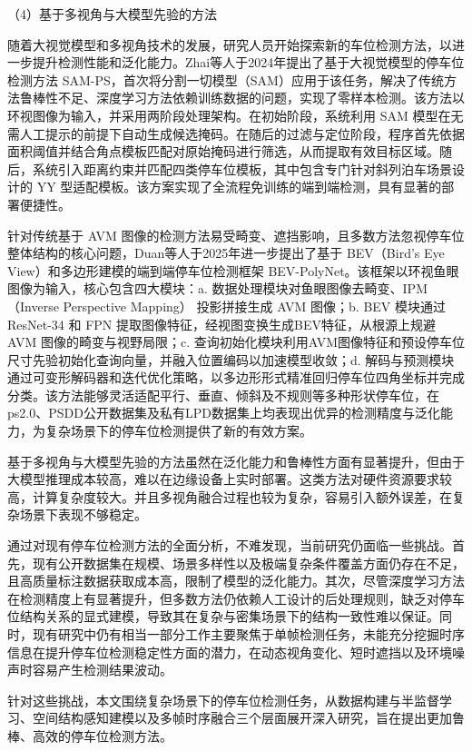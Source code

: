 （4）基于多视角与大模型先验的方法

随着大视觉模型和多视角技术的发展，研究人员开始探索新的车位检测方法，以进一步提升检测性能和泛化能力。Zhai等人\cite{zhai2024sam}于2024年提出了基于大视觉模型的停车位检测方法 SAM-PS，首次将分割一切模型（SAM\cite{kirillov2023segment}）应用于该任务，解决了传统方法鲁棒性不足、深度学习方法依赖训练数据的问题，实现了零样本检测。该方法以环视图像为输入，并采用两阶段处理架构。在初始阶段，系统利用 SAM 模型在无需人工提示的前提下自动生成候选掩码。在随后的过滤与定位阶段，程序首先依据面积阈值并结合角点模板匹配对原始掩码进行筛选，从而提取有效目标区域。随后，系统引入距离约束并匹配四类停车位模板，其中包含专门针对斜列泊车场景设计的 YY 型适配模板。该方案实现了全流程免训练的端到端检测，具有显著的部署便捷性。

针对传统基于 AVM 图像的检测方法易受畸变、遮挡影响，且多数方法忽视停车位整体结构的核心问题，Duan等人\cite{duan2025bev}于2025年进一步提出了基于 BEV（Bird's Eye View）和多边形建模的端到端停车位检测框架 BEV-PolyNet。该框架以环视鱼眼图像为输入，核心包含四大模块：a. 数据处理模块对鱼眼图像去畸变、IPM（Inverse Perspective Mapping） 投影拼接生成 AVM 图像；b. BEV 模块通过 ResNet-34 和 FPN 提取图像特征，经视图变换生成BEV特征，从根源上规避 AVM 图像的畸变与视野局限；c. 查询初始化模块利用AVM图像特征和预设停车位尺寸先验初始化查询向量，并融入位置编码以加速模型收敛；d. 解码与预测模块通过可变形解码器和迭代优化策略，以多边形形式精准回归停车位四角坐标并完成分类。该方法能够灵活适配平行、垂直、倾斜及不规则等多种形状停车位，在ps2.0、PSDD公开数据集及私有LPD数据集上均表现出优异的检测精度与泛化能力，为复杂场景下的停车位检测提供了新的有效方案。

基于多视角与大模型先验的方法虽然在泛化能力和鲁棒性方面有显著提升，但由于大模型推理成本较高，难以在边缘设备上实时部署。这类方法对硬件资源要求较高，计算复杂度较大。并且多视角融合过程也较为复杂，容易引入额外误差，在复杂场景下表现不够稳定。

通过对现有停车位检测方法的全面分析，不难发现，当前研究仍面临一些挑战。首先，现有公开数据集在规模、场景多样性以及极端复杂条件覆盖方面仍存在不足，且高质量标注数据获取成本高，限制了模型的泛化能力。其次，尽管深度学习方法在检测精度上有显著提升，但多数方法仍依赖人工设计的后处理规则，缺乏对停车位结构关系的显式建模，导致其在复杂与密集场景下的结构一致性难以保证。同时，现有研究中仍有相当一部分工作主要聚焦于单帧检测任务，未能充分挖掘时序信息在提升停车位检测稳定性方面的潜力，在动态视角变化、短时遮挡以及环境噪声时容易产生检测结果波动。

针对这些挑战，本文围绕复杂场景下的停车位检测任务，从数据构建与半监督学习、空间结构感知建模以及多帧时序融合三个层面展开深入研究，旨在提出更加鲁棒、高效的停车位检测方法。




